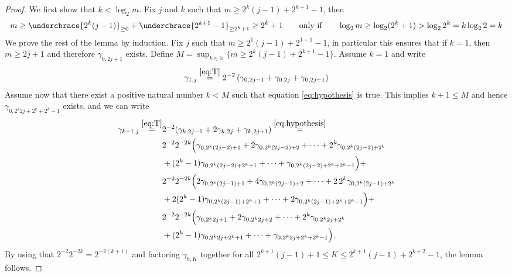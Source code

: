 \documentclass[11pt,english,a4paper]{article}
\begin{document}
\begin{proof}
We first show that $k < \log_2 m$. Fix $j$ and $k$ such that $m \geq 2^k(j-1) + 2^{k+1} - 1$, then
\[
m \geq \undercbrace{2^k(j-1)}_{\geq 0} + \undercbrace{2^{k+1} - 1}_{\geq 2^k +1} \geq 2^k + 1 \qquad \text{only if} \qquad \log_2m \geq \log_2(2^k + 1) > \log_2 2^k = k \log_2 2 = k
\]
We prove the rest of the lemma by induction. Fix $j$ such that $m \geq 2^1(j-1) + 2^{1+1} - 1$, in particular this ensures that if $k = 1$, then $m \geq 2j + 1$ and therefore $\gamma_{  0,2j+1}$ exists. Define $M = \sup_{k \in \mathbb{N}} \{m \geq 2^k(j-1) + 2^{k+1} - 1\}$. Assume $k=1$ and write
\[
\gamma_{  1,j} \stackrel{\eqref{eq:T}}{=} 2^{-2} \left( \gamma_{  0,2j-1} + \gamma_{  0,2j} + \gamma_{  0,2j+1} \right)
\]
Assume now that there exist a positive natural number $k < M$ such that equation \eqref{eq:hypothesis} is true. This implies $k+1 \leq M$ and hence $\gamma_{0,2^k2j+2^k+2^k-1}$ exists, and we can write
\begin{align*} 
\gamma_{  k+1,j} \stackrel{\eqref{eq:T}}{=} &2^{-2} (\gamma_{  k,2j-1} + 2\gamma_{  k,2j} + \gamma_{  k,2j+1}) \stackrel{\eqref{eq:hypothesis}}{=} \\
&2^{-2} 2^{-2k}\Big( \gamma_{0,2^k(2j-2)+1} + 2\gamma_{0,2^k(2j-2)+2} + \cdots + 2^k\gamma_{0,2^k(2j-2)+2^k} \\
&+ (2^k-1)\gamma_{0,2^k(2j-2)+2^k+1} + \cdots + \gamma_{0,2^k(2j-2)+2^k+2^k-1}
\Big) + \\
&2^{-2} 2^{-2k}\Big( 2\gamma_{0,2^k(2j-1)+1} + 4\gamma_{0,2^k(2j-1)+2} + \cdots + 2\,2^k\gamma_{0,2^k(2j-1)+2^k} \\
&+ 2(2^k-1)\gamma_{0,2^k(2j-1)+2^k+1} + \cdots + 2\gamma_{0,2^k(2j-1)+2^k+2^k-1}
\Big) + \\
&2^{-2} 2^{-2k}\Big( \gamma_{0,2^k2j+1} + 2\gamma_{0,2^k2j+2} + \cdots + 2^k\gamma_{0,2^k2j +2^k} \\
&+ (2^k-1)\gamma_{0,2^k2j+2^k+1} + \cdots + \gamma_{0,2^k2j+2^k+2^k-1}
\Big).
\end{align*}
By using that $2^{-2} 2^{-2k} = 2^{-2(k+1)}$ and factoring $\gamma_{0,K}$ together for all $2^{k+1}(j-1) + 1 \leq K \leq 2^{k+1}(j-1) + 2^{k+2}-1$, the lemma follows.
\end{proof}
\end{document}
